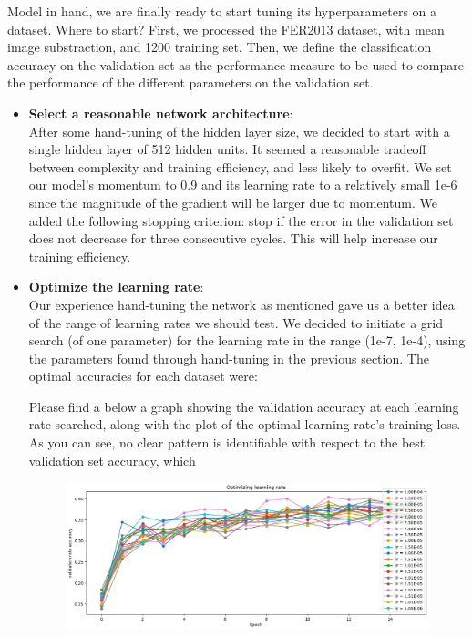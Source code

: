 Model in hand, we are finally ready to start tuning its hyperparameters on a dataset.
Where to start?
First, we processed the FER2013 dataset, with mean image substraction, and 1200 training set.
Then, we define the classification accuracy on the validation set as
the performance measure to be used to compare the performance of the different parameters on the validation set.

\begin{itemize}[topsep=-13pt]
\item \textbf{Select a reasonable network architecture}:\\
  After some hand-tuning of the hidden layer size, we decided to start with a single hidden layer of 512 hidden units.
  It seemed a reasonable tradeoff between complexity and training efficiency, and less likely to overfit.
  We set our model's momentum to 0.9 and its learning rate to a relatively small 1e-6
  since the magnitude of the gradient will be larger due to momentum.
  We added the following stopping criterion: stop if the error in the validation set does not decrease for three consecutive cycles.
  This will help increase our training efficiency.

\item \textbf{Optimize the learning rate}:\\
  Our experience hand-tuning the network as mentioned gave us a better idea of the range of learning rates we should test.
  We decided to initiate a grid search (of one parameter) for the learning rate in the range (1e-7, 1e-4),
  using the parameters found through hand-tuning in the previous section.
  The optimal accuracies for each dataset were:
  
  Please find a below a graph showing the validation accuracy at each learning rate searched,
  along with the plot of the optimal learning rate's training loss.
  As you can see, no clear pattern is identifiable with respect to the best validation set accuracy, which 
  \begin{figure}[!ht]
      \centering
      {{\includegraphics[scale = 0.50]{../src/optimizers/outputs/grid_search/learning_rates.png}}}
  \end{figure}



\end{itemize}
